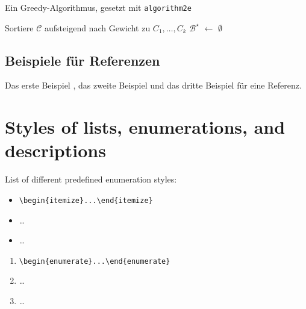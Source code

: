 \documentclass[a4paper,german]{tui-algo-seminar}
\begin{document}
\begin{algorithm}[ht]
  \caption{Ein Greedy-Algorithmus, gesetzt mit \texttt{algorithm2e}}
  Sortiere $\mathcal{C}$ aufsteigend nach Gewicht zu $C_1,\ldots,C_k$\;
  $\mathcal{B}^\star$ $\leftarrow$ $\emptyset$\; %
\end{algorithm}

\subsection{Beispiele für Referenzen}
\label{sub:beispiele_fur_referenzen}

Das erste Beispiel \cite{DBLP:journals/cacm/Knuth74}, das zweite Beispiel
\cite{DBLP:journals/cacm/Dijkstra68a} und  das dritte Beispiel \cite{DBLP:books/mk/GrayR93, DBLP:conf/focs/HopcroftPV75}
für eine Referenz.

\nocite{DBLP:conf/focs/FOCS16}





\appendix

\section{Styles of lists, enumerations, and descriptions}
\label{sec:itemStyles}

List of different predefined enumeration styles:

\begin{itemize}
\item \verb|\begin{itemize}...\end{itemize}|
\item \dots
\item \dots
\end{itemize}

\begin{enumerate}
\item \verb|\begin{enumerate}...\end{enumerate}|
\item \dots
\item \dots
\end{enumerate}
\end{document}
